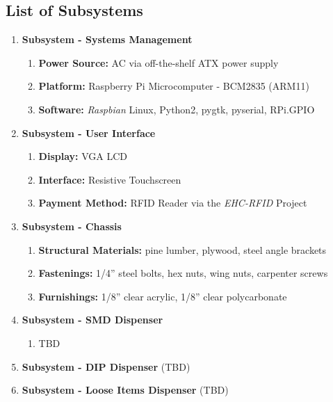 \documentclass[12pt,draft,oneside]{article}
\begin{document}
\subsection{List of Subsystems}
\begin{enumerate}
  \item \textbf{Subsystem - Systems Management}
    \begin{enumerate}
      \item \textbf{Power Source:} AC via off-the-shelf ATX power supply
      \item \textbf{Platform:} Raspberry Pi Microcomputer - BCM2835 (ARM11)
      \item \textbf{Software:} \emph{Raspbian} Linux, Python2, pygtk, pyserial, RPi.GPIO
    \end{enumerate}
  \item \textbf{Subsystem - User Interface}
    \begin{enumerate}
      \item \textbf{Display:} VGA LCD
      \item \textbf{Interface:} Resistive Touchscreen
      \item \textbf{Payment Method:} RFID Reader via the \emph{EHC-RFID} Project
    \end{enumerate}
  \item \textbf{Subsystem - Chassis}
    \begin{enumerate}
      \item \textbf{Structural Materials:} pine lumber, plywood, steel angle brackets
      \item \textbf{Fastenings:} 1/4'' steel bolts, hex nuts, wing nuts, carpenter screws
      \item \textbf{Furnishings:} 1/8'' clear acrylic, 1/8'' clear polycarbonate
    \end{enumerate}
  \item \textbf{Subsystem - SMD Dispenser}
    \begin{enumerate}
      \item TBD
    \end{enumerate}
  \item \textbf{Subsystem - DIP Dispenser} (TBD)
  \item \textbf{Subsystem - Loose Items Dispenser} (TBD)
\end{enumerate}
\end{document}
